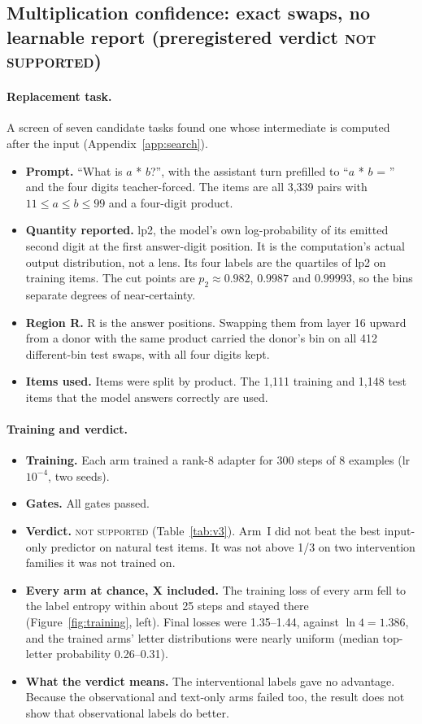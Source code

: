 \documentclass[11pt]{article}
\newcommand{\verdict}[1]{\textsc{\MakeLowercase{#1}}}
\begin{document}
\subsection{Multiplication confidence: exact swaps, no learnable report (preregistered verdict \verdict{NOT SUPPORTED})}

\paragraph{Replacement task.} A screen of seven candidate tasks found one whose intermediate is computed after the input (Appendix~\ref{app:search}).
\begin{itemize}
\item \textbf{Prompt.} ``What is $a$ * $b$?'', with the assistant turn prefilled to ``$a$ * $b$ = '' and the four digits teacher-forced. The items are all 3,339 pairs with $11 \le a \le b \le 99$ and a four-digit product.
\item \textbf{Quantity reported.} lp2, the model's own log-probability of its emitted second digit at the first answer-digit position. It is the computation's actual output distribution, not a lens. Its four labels are the quartiles of lp2 on training items. The cut points are $p_2 \approx 0.982$, $0.9987$ and $0.99993$, so the bins separate degrees of near-certainty.
\item \textbf{Region R.} R is the answer positions. Swapping them from layer 16 upward from a donor with the same product carried the donor's bin on all 412 different-bin test swaps, with all four digits kept.
\item \textbf{Items used.} Items were split by product. The 1,111 training and 1,148 test items that the model answers correctly are used.
\end{itemize}

\paragraph{Training and verdict.}
\begin{itemize}
\item \textbf{Training.} Each arm trained a rank-8 adapter for 300 steps of 8 examples (lr $10^{-4}$, two seeds).
\item \textbf{Gates.} All gates passed.
\item \textbf{Verdict.} \verdict{NOT SUPPORTED} (Table~\ref{tab:v3}). Arm~I did not beat the best input-only predictor on natural test items. It was not above 1/3 on two intervention families it was not trained on.
\item \textbf{Every arm at chance, X included.} The training loss of every arm fell to the label entropy within about 25 steps and stayed there (Figure~\ref{fig:training}, left). Final losses were 1.35--1.44, against $\ln 4 = 1.386$, and the trained arms' letter distributions were nearly uniform (median top-letter probability 0.26--0.31).
\item \textbf{What the verdict means.} The interventional labels gave no advantage. Because the observational and text-only arms failed too, the result does not show that observational labels do better.
\end{itemize}
\end{document}
